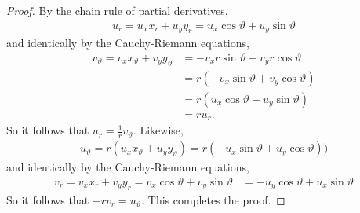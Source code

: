 \documentclass[letter]{article}
\newenvironment{menumerate}{%
  \edef\backupindent{\the\parindent}%
  \enumerate%
  \setlength{\parindent}{\backupindent}%
}{\endenumerate}
\begin{document}
\begin{menumerate}
 	\begin{proof}
 		By the chain rule of partial derivatives,
 		\begin{equation}
 			\begin{aligned}
 				u_r =u_xx_r + u_yy_r = u_x\cos \vartheta + u_y \sin \vartheta	
 			\end{aligned}	
 		\end{equation}	
 		and identically by the Cauchy-Riemann  equations,
 				\begin{equation}
 			\begin{aligned}
 				v_\vartheta = v_xx_\vartheta + v_yy_\vartheta &= -v_xr\sin\vartheta + v_yr\cos\vartheta \\
 				&= r(-v_x\sin \vartheta + v_y \cos \vartheta) \\
 				&= r(u_x\cos \vartheta + u_y \sin \vartheta	) \\
 				&= r u_r.
 			\end{aligned}	
 		\end{equation}	
 		So it follows that $u_r = \frac{1}{r} v_\vartheta.$
 		Likewise, 
 		\begin{equation}
 			\begin{aligned}
 				u_\vartheta =r(u_xx_\vartheta + u_yy_\vartheta) = r(-u_x\sin\vartheta + u_y\cos \vartheta))
 			\end{aligned}	
 		\end{equation}	
		and identically by the Cauchy-Riemann equations,
 		\begin{equation}
 			\begin{aligned}
 				v_r = v_xx_r +v_yy_r = v_x\cos\vartheta + v_y\sin\vartheta &= -u_y\cos\vartheta + u_x \sin\vartheta 			\end{aligned}	
 		\end{equation}	
 		So it follows that $-r v_r = u_\vartheta.$ This completes the proof.
 	\end{proof}

\end{menumerate}
\end{document}
